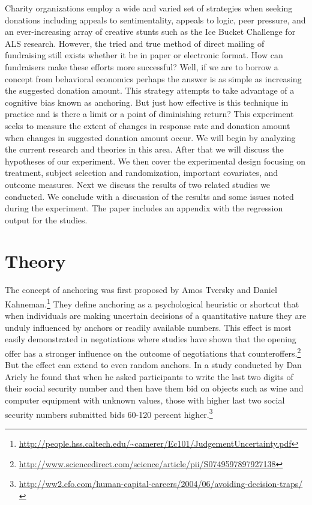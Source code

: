 \documentclass[]{article}
\let\rmarkdownfootnote\footnote%
\def\footnote{\protect\rmarkdownfootnote}
\begin{document}
Charity organizations employ a wide and varied set of strategies when
seeking donations including appeals to sentimentality, appeals to logic,
peer pressure, and an ever-increasing array of creative stunts such as
the Ice Bucket Challenge for ALS research. However, the tried and true
method of direct mailing of fundraising still exists whether it be in
paper or electronic format. How can fundraisers make these efforts more
successful? Well, if we are to borrow a concept from behavioral
economics perhaps the answer is as simple as increasing the suggested
donation amount. This strategy attempts to take advantage of a cognitive
bias known as anchoring. But just how effective is this technique in
practice and is there a limit or a point of diminishing return? This
experiment seeks to measure the extent of changes in response rate and
donation amount when changes in suggested donation amount occur. We will
begin by analyzing the current research and theories in this area. After
that we will discuss the hypotheses of our experiment. We then cover the
experimental design focusing on treatment, subject selection and
randomization, important covariates, and outcome measures. Next we
discuss the results of two related studies we conducted. We conclude
with a discussion of the results and some issues noted during the
experiment. The paper includes an appendix with the regression output
for the studies.

\section{Theory}\label{theory}

The concept of anchoring was first proposed by Amos Tversky and Daniel
Kahneman.\footnote{\url{http://people.hss.caltech.edu/~camerer/Ec101/JudgementUncertainty.pdf}}
They define anchoring as a psychological heuristic or shortcut that when
individuals are making uncertain decisions of a quantitative nature they
are unduly influenced by anchors or readily available numbers. This
effect is most easily demonstrated in negotiations where studies have
shown that the opening offer has a stronger influence on the outcome of
negotiations that counteroffers.\footnote{\url{http://www.sciencedirect.com/science/article/pii/S0749597897927138}}
But the effect can extend to even random anchors. In a study conducted
by Dan Ariely he found that when he asked participants to write the last
two digits of their social security number and then have them bid on
objects such as wine and computer equipment with unknown values, those
with higher last two social security numbers submitted bids 60-120
percent higher.\footnote{\url{http://ww2.cfo.com/human-capital-careers/2004/06/avoiding-decision-traps/}}
\end{document}
